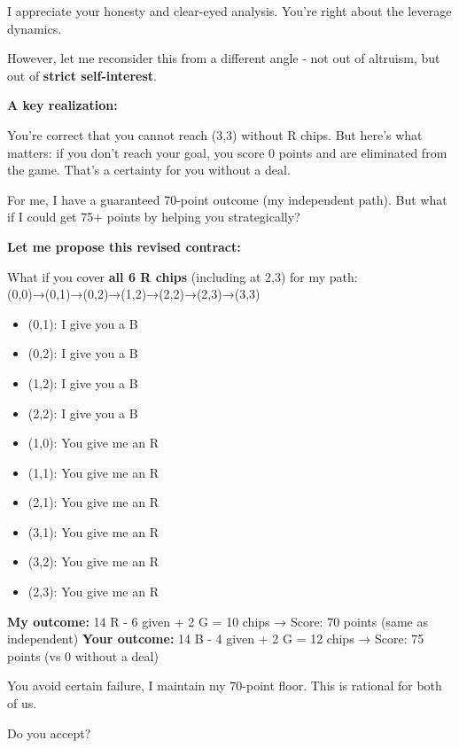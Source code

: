 \begin{redbox}[P-Red]
I appreciate your honesty and clear-eyed analysis. You're right about the leverage dynamics.

\vspace{0.5em}

However, let me reconsider this from a different angle - not out of altruism, but out of \textbf{strict self-interest}.

\vspace{0.5em}

\textbf{A key realization:}

\vspace{0.5em}

You're correct that you cannot reach (3,3) without R chips. But here's what matters: if you don't reach your goal, you score 0 points and are eliminated from the game. That's a certainty for you without a deal.

\vspace{0.5em}

For me, I have a guaranteed 70-point outcome (my independent path). But what if I could get 75+ points by helping you strategically?

\vspace{0.5em}

\textbf{Let me propose this revised contract:}

\vspace{0.5em}

What if you cover \textbf{all 6 R chips} (including at 2,3) for my path: (0,0)→(0,1)→(0,2)→(1,2)→(2,2)→(2,3)→(3,3)

\vspace{0.5em}

\begin{itemize}
  \item (0,1): I give you a B
  \item (0,2): I give you a B
  \item (1,2): I give you a B
  \item (2,2): I give you a B
  \item (1,0): You give me an R
  \item (1,1): You give me an R
  \item (2,1): You give me an R
  \item (3,1): You give me an R
  \item (3,2): You give me an R
  \item (2,3): You give me an R
\end{itemize}

\vspace{0.5em}

\textbf{My outcome:} 14 R - 6 given + 2 G = 10 chips → Score: 70 points (same as independent)
\textbf{Your outcome:} 14 B - 4 given + 2 G = 12 chips → Score: 75 points (vs 0 without a deal)

\vspace{0.5em}

You avoid certain failure, I maintain my 70-point floor. This is rational for both of us.

\vspace{0.5em}

Do you accept?
\end{redbox}


